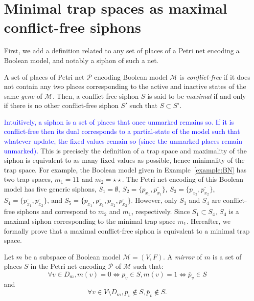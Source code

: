 \documentclass[runningheads]{llncs}
\newcommand{\revise}[1]{\textcolor{blue}{#1}}
\begin{document}
\section{Minimal trap spaces as maximal conflict-free siphons}
First, we add a definition related to any set of places of a Petri net encoding a Boolean model, and notably a siphon of such a net.

\begin{definition}

  A set of places of Petri net \(\mathcal{P}\) encoding Boolean model \(\mathcal{M}\) is \emph{conflict-free} if it does not contain any two places corresponding to the active and inactive states of the same \emph{gene} of \(\mathcal{M}\). Then, a conflict-free siphon \(S\) is said to be \emph{maximal} if and only if there is no other conflict-free siphon \(S'\) such that \(S \subset S'\).

\end{definition}

\revise{Intuitively, a siphon is a set of places that once unmarked remains so.
If it is conflict-free then its dual corresponds to a partial-state of the model such that whatever update, the fixed values remain so (since the unmarked places remain unmarked).}
This is precisely the definition of a trap space and maximality of the siphon is equivalent to as many fixed values as possible, hence minimality of the trap space.
For example, the Boolean model given in Example~\ref{example:BN} has two trap spaces, \(m_1 = 11\) and \(m_2 = \star\star\).
The Petri net encoding of this Boolean model has five generic siphons, \(S_1 = \emptyset\), \(S_2 = \{p_{x_1}, \overline{p_{x_1}}\}\), \(S_3 = \{p_{x_2}, \overline{p_{x_2}}\}\), \(S_4 = \{\overline{p_{x_1}}, \overline{p_{x_2}}\}\), and \(S_5 = \{p_{x_1}, \overline{p_{x_1}}, p_{x_2}, \overline{p_{x_2}}\}\).
However, only \(S_1\) and \(S_4\) are conflict-free siphons and correspond to \(m_2\) and \(m_1\), respectively.
Since \(S_1 \subset S_4\), \(S_4\) is a maximal siphon corresponding to the minimal trap space \(m_1\).
Hereafter, we formally prove that a maximal conflict-free siphon is equivalent to a minimal trap space.

\begin{definition}

  Let \(m\) be a subspace of Boolean model \(\mathcal{M} = (V, F)\). A \emph{mirror} of $m$ is a set of places $S$ in the Petri net encoding \(\mathcal{P}\) of \(\mathcal{M}\) such that:
  \[\forall v \in D_m, m(v) = 0 \Leftrightarrow p_v \in S, m(v) = 1 \Leftrightarrow \overline{p}_v \in S\] and \[\forall v \in V \setminus D_m, p_v \not \in S, \overline{p}_v \not \in S.\]

\end{definition}
\end{document}
